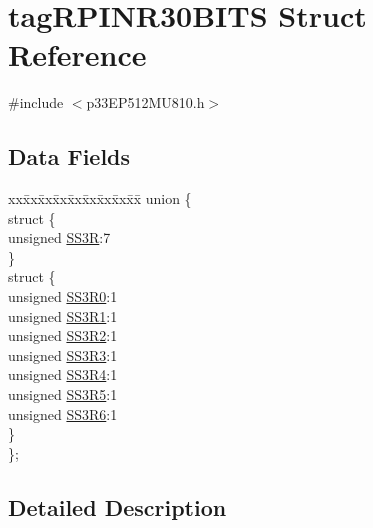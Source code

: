 \hypertarget{structtag_r_p_i_n_r30_b_i_t_s}{}\section{tag\+R\+P\+I\+N\+R30\+B\+I\+TS Struct Reference}
\label{structtag_r_p_i_n_r30_b_i_t_s}


{\ttfamily \#include $<$p33\+E\+P512\+M\+U810.\+h$>$}

\subsection*{Data Fields}
\begin{DoxyCompactItemize}
\item 
\begin{tabbing}
xx\=xx\=xx\=xx\=xx\=xx\=xx\=xx\=xx\=\kill
union \{\\
\>struct \{\\
\>\>unsigned \hyperlink{structtag_r_p_i_n_r30_b_i_t_s_aa30fd5690f065659f14efde4ec851b96}{SS3R}:7\\
\>\} \\
\>struct \{\\
\>\>unsigned \hyperlink{structtag_r_p_i_n_r30_b_i_t_s_aa3d72bc639e7205ded457caa9380adf5}{SS3R0}:1\\
\>\>unsigned \hyperlink{structtag_r_p_i_n_r30_b_i_t_s_ad94dc85b7342b76803be25b94686e045}{SS3R1}:1\\
\>\>unsigned \hyperlink{structtag_r_p_i_n_r30_b_i_t_s_a73acaec184c48db1d92673f2d597ccf1}{SS3R2}:1\\
\>\>unsigned \hyperlink{structtag_r_p_i_n_r30_b_i_t_s_a8bd3baf3077e1b2976516dfab5b05bb9}{SS3R3}:1\\
\>\>unsigned \hyperlink{structtag_r_p_i_n_r30_b_i_t_s_ae3495d8275928bcb4133f81cd5c9cb73}{SS3R4}:1\\
\>\>unsigned \hyperlink{structtag_r_p_i_n_r30_b_i_t_s_ad59276829cb3d4773f704d9e7b0308d3}{SS3R5}:1\\
\>\>unsigned \hyperlink{structtag_r_p_i_n_r30_b_i_t_s_ac13dcd3f9c1fc18818e99e50aaa27d6e}{SS3R6}:1\\
\>\} \\
\}; \\

\end{tabbing}\end{DoxyCompactItemize}


\subsection{Detailed Description}


